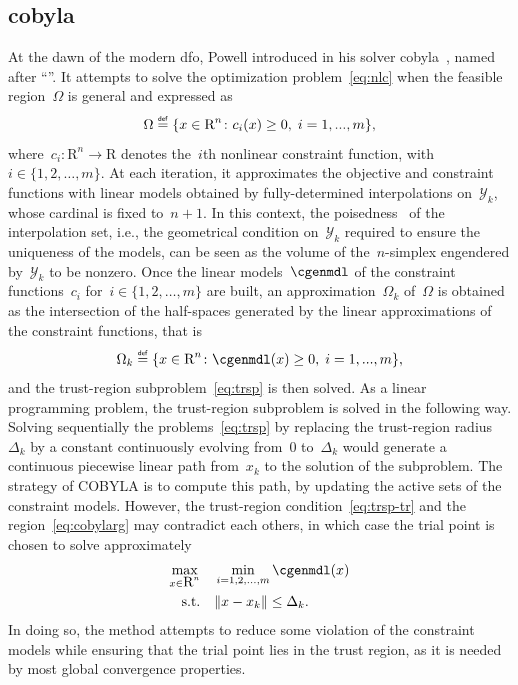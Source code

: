 \documentclass[11pt,draft]{article}
\numberwithin{equation}{section}
\def\R{\ensuremath{\mathds{R}}}
\def\eqdef{\ensuremath{\mathrel{\stackrel{\text{\tiny\textsf{def}}}{=}}}}
\newcommand\norm[2][]{#1\|#2#1\|}
\newcommand\set[2][]{#1\{#2#1\}}
\def\srchsp{\ensuremath{\Omega}}
\newcommand\cgen[1][i]{c_{#1}}
\newcommand\srchspmdl[1][k]{\Omega_{#1}}
\newcommand\iter[1][k]{x_{#1}}
\newcommand\trg[1][k]{\Delta_{#1}}
\newcommand\itpls[1][k]{\mathcal{Y}_{#1}}
\def\R{\mbox{R}}
\begin{document}
\subsection{\gls{cobyla}}

At the dawn of the modern \gls{dfo}, Powell introduced in  his solver \gls{cobyla}~\cite{Powell_1994}, named after \enquote{}.
It attempts to solve the optimization problem~\eqref{eq:nlc} when the feasible region~$\srchsp$ is general and expressed as
\[
    \srchsp \eqdef \set{x \in \R^n \colon \cgen(x) \ge 0,\; i=1,...,m},
\]
where~$\cgen \colon \R^n \to \R$ denotes the~$i$th nonlinear constraint function, with~$i \in \set{1, 2, \dots, m}$.
At each iteration, it approximates the objective and constraint functions with linear models obtained by fully-determined interpolations on~$\itpls$, whose cardinal is fixed to~$n + 1$.
In this context, the poisedness~\cite[\S 1]{Sauer_Xu_1995} of the interpolation set, i.e., the geometrical condition on~$\itpls$ required to ensure the uniqueness of the models, can be seen as the volume of the~$n$-simplex engendered by~$\itpls$ to be nonzero.
Once the linear models~$\cgenmdl$ of the constraint functions~$\cgen$ for~$i \in \set{1, 2, \dots, m}$ are built, an approximation~$\srchspmdl$ of~$\srchsp$ is obtained as the intersection of the half-spaces generated by the linear approximations of the constraint functions, that is
\begin{equation}
    \label{eq:cobylarg}
    \srchspmdl \eqdef \set{x \in \R^n \colon \cgenmdl(x) \ge 0,\; i=1,...,m},
\end{equation}
and the trust-region subproblem~\eqref{eq:trsp} is then solved.
As a linear programming problem, the trust-region subproblem is solved in the following way.
Solving sequentially the problems~\eqref{eq:trsp} by replacing the trust-region radius~$\trg$ by a constant continuously evolving from~$0$ to~$\trg$ would generate a continuous piecewise linear path from~$\iter$ to the solution of the subproblem.
The strategy of COBYLA is to compute this path, by updating the active sets of the constraint models.
However, the trust-region condition~\eqref{eq:trsp-tr} and the region~\eqref{eq:cobylarg} may contradict each others, in which case the trial point is chosen to solve approximately
\begin{align*}
    \max_{x \in \R^n}   & \quad \min_{i = 1, 2, \dots, m} \cgenmdl(x)\\
    \text{s.t.}         & \quad \norm{x - \iter} \le \trg.
\end{align*}
In doing so, the method attempts to reduce some violation of the constraint models while ensuring that the trial point lies in the trust region, as it is needed by most global convergence properties.
\end{document}
